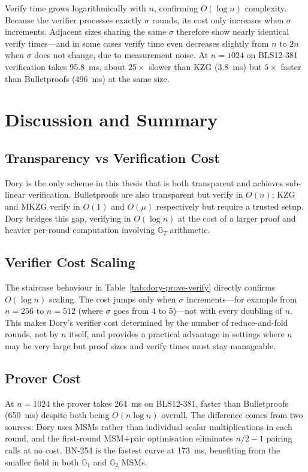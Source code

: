 Verify time grows logarithmically with $n$, confirming $O(\log n)$
complexity. Because the verifier processes exactly $\sigma$ rounds, its cost
only increases when $\sigma$ increments. Adjacent sizes sharing the same
$\sigma$ therefore show nearly identical verify times---and in some cases
verify time even decreases slightly from $n$ to $2n$ when $\sigma$ does not
change, due to measurement noise. At $n = 1024$ on BLS12-381 verification
takes 95.8~ms, about $25\times$ slower than KZG (3.8~ms) but $5\times$
faster than Bulletproofs (496~ms) at the same size.

\section{Discussion and Summary}

\subsection{Transparency vs Verification Cost}

Dory is the only scheme in this thesis that is both transparent and achieves
sub-linear verification. Bulletproofs are also transparent but verify in
$O(n)$; KZG and MKZG verify in $O(1)$ and $O(\mu)$ respectively but require
a trusted setup. Dory bridges this gap, verifying in $O(\log n)$ at the cost
of a larger proof and heavier per-round computation involving $\mathbb{G}_T$
arithmetic.

\subsection{Verifier Cost Scaling}

The staircase behaviour in Table~\ref{tab:dory-prove-verify} directly confirms
$O(\log n)$ scaling. The cost jumps only when $\sigma$ increments---for
example from $n = 256$ to $n = 512$ (where $\sigma$ goes from 4 to 5)---not
with every doubling of $n$. This makes Dory's verifier cost determined by the
number of reduce-and-fold rounds, not by $n$ itself, and provides a practical
advantage in settings where $n$ may be very large but proof sizes and verify
times must stay manageable.

\subsection{Prover Cost}

At $n = 1024$ the prover takes 264~ms on BLS12-381, faster than Bulletproofs
(650~ms) despite both being $O(n\log n)$ overall. The difference comes from
two sources: Dory uses MSMs rather than individual scalar multiplications in
each round, and the first-round MSM$+$pair optimisation eliminates $n/2 - 1$
pairing calls at no cost. BN-254 is the fastest curve at 173~ms, benefiting
from the smaller field in both $\mathbb{G}_1$ and $\mathbb{G}_2$ MSMs.

